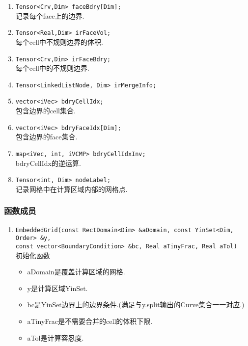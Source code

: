 \documentclass[a4paper]{book}
\numberwithin{equation}{chapter}
\theoremstyle{definition}
\begin{document}
\begin{enumerate}
  \item \texttt{Tensor<Crv,Dim>     faceBdry[Dim];} \\
    记录每个face上的边界.

    \item \texttt{Tensor<Real,Dim>    irFaceVol;}  \\
    每个cell中不规则边界的体积.

  \item \texttt{Tensor<Crv,Dim>     irFaceBdry;} \\
    每个cell中的不规则边界.

  \item \texttt{Tensor<LinkedListNode, Dim> irMergeInfo; } \\
  
  \item \texttt{vector<iVec>        bdryCellIdx;} \\
  包含边界的cell集合.
  
  \item \texttt{vector<iVec>        bdryFaceIdx[Dim];} \\
  包含边界的face集合.
  
  \item \texttt{map<iVec, int, iVCMP> bdryCellIdxInv; } \\
  bdryCellIdx的逆运算.
  
  \item \texttt{Tensor<int, Dim>    nodeLabel;} \\
  记录网格中在计算区域内部的网格点.

\end{enumerate}

\subsubsection{函数成员}
\begin{enumerate}
  \item \texttt{EmbeddedGrid(const RectDomain<Dim> \&aDomain,
  const YinSet<Dim, Order> \&y, \\
  const vector<BoundaryCondition> \&bc,
  Real aTinyFrac,
  Real aTol)} \\
  初始化函数
  \begin{itemize}
    \item aDomain是覆盖计算区域的网格.
    \item y是计算区域YinSet.
    \item bc是YinSet边界上的边界条件.(满足与y.split输出的Curve集合一一对应.)
    \item aTinyFrac是不需要合并的cell的体积下限.
    \item aTol是计算容忍度.
  \end{itemize}

\end{enumerate}
\end{document}

